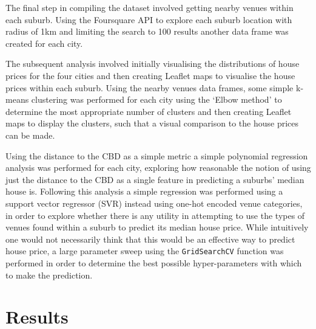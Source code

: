 \documentclass[12pt]{article}
\begin{document}
    The final step in compiling the dataset involved getting nearby venues within each suburb. Using the Foursquare API to explore each suburb location with radius of 1km and limiting the search to 100 results another data frame was created for each city.

    The subsequent analysis involved initially visualising the distributions of house prices for the four cities and then creating Leaflet maps to visualise the house prices within each suburb. Using the nearby venues data frames, some simple k-means clustering was performed for each city using the `Elbow method' to determine the most appropriate number of clusters and then creating Leaflet maps to display the clusters, such that a visual comparison to the house prices can be made.

    Using the distance to the CBD as a simple metric a simple polynomial regression analysis was performed for each city, exploring how reasonable the notion of using just the distance to the CBD as a single feature in predicting a suburbs' median house is. Following this analysis a simple regression was performed using a support vector regressor (SVR) instead using one-hot encoded venue categories, in order to explore whether there is any utility in attempting to use the types of venues found within a suburb to predict its median house price. While intuitively one would not necessarily think that this would be an effective way to predict house price, a large parameter sweep using the \texttt{GridSearchCV} function was performed in order to determine the best possible hyper-parameters with which to make the prediction.


\section{Results}
\end{document}
